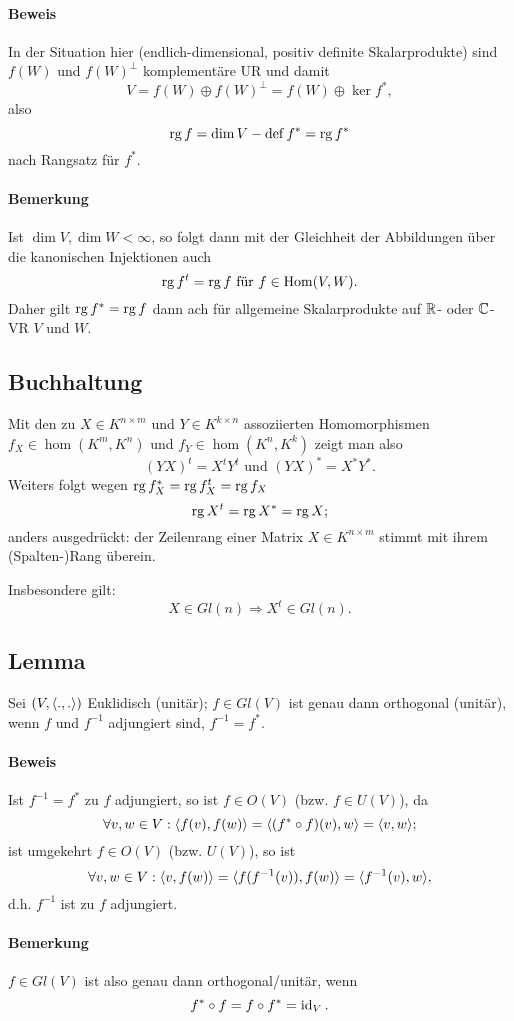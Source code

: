 \paragraph{Beweis}
	In der Situation hier (endlich-dimensional, positiv definite Skalarprodukte) sind $ f(W) $ und $ f(W)^\perp $ komplementäre UR und damit
		\[ V = f(W)\oplus f(W)^\perp = f(W)\oplus \ker f^*, \]
	also
		\[ \operatorname{rg} f = \dim V-\operatorname{def} f^* = \operatorname{rg} f^* \]
	nach Rangsatz für $ f^* $.
\paragraph{Bemerkung}
	Ist $ \dim V, \dim W <\infty $, so folgt dann mit der Gleichheit der Abbildungen über die kanonischen Injektionen auch
		\[ \operatorname{rg} f^t = \operatorname{rg} f \text{ für } f\in \operatorname{Hom}(V,W). \]
	Daher gilt $ \operatorname{rg} f^* = \operatorname{rg} f $ dann ach für allgemeine Skalarprodukte auf $ \mathbb{R} $- oder $ \mathbb{C} $-VR $ V $ und $ W $.

\subsection{Buchhaltung}
	Mit den zu $ X\in K^{n\times m} $ und $ Y\in K^{k\times n} $ assoziierten Homomorphismen $ f_X\in \hom(K^m,K^n) $ und $ f_Y\in \hom(K^n,K^k) $ zeigt man also
		\[ (YX)^t = X^tY^t \text{ und } (YX)^* = X^*Y^*. \]
	Weiters folgt wegen $ \operatorname{rg} f_X^* = \operatorname{rg} f_X^t = \operatorname{rg} f_X $
		\[ \operatorname{rg} X^t = \operatorname{rg} X^* = \operatorname{rg} X; \]
	anders ausgedrückt: der Zeilenrang einer Matrix $ X\in K^{n\times m} $ stimmt mit ihrem (Spalten-)Rang überein.
	
	Insbesondere gilt:
		\[ X\in Gl(n) \Rightarrow X^t \in Gl(n). \]
		
\subsection{Lemma}
	Sei $ (V,\langle .,. \rangle) $ Euklidisch (unitär); $ f\in Gl(V) $ ist genau dann orthogonal (unitär), wenn $ f $ und $ f^{-1} $ adjungiert sind, $ f^{-1} = f^* $.
\paragraph{Beweis}
	Ist $ f^{-1}=f^* $ zu $ f $ adjungiert, so ist $ f\in O(V) $ (bzw. $ f\in U(V) $), da
		\[ \forall v,w\in V: \langle f(v),f(w) \rangle = \langle (f^*\circ f)(v),w \rangle = \langle v,w \rangle; \]
	ist umgekehrt $ f\in O(V) $ (bzw. $ U(V) $), so ist
		\[ \forall v,w\in V: \langle v,f(w) \rangle = \langle f(f^{-1}(v)),f(w) \rangle = \langle f^{-1}(v),w \rangle, \]
	d.h. $ f^{-1} $ ist zu $ f $ adjungiert.
\paragraph{Bemerkung}
	$ f\in Gl(V) $ ist also genau dann orthogonal/unitär, wenn
		\[ f^*\circ f = f\circ f^* = \operatorname{id}_V. \]
